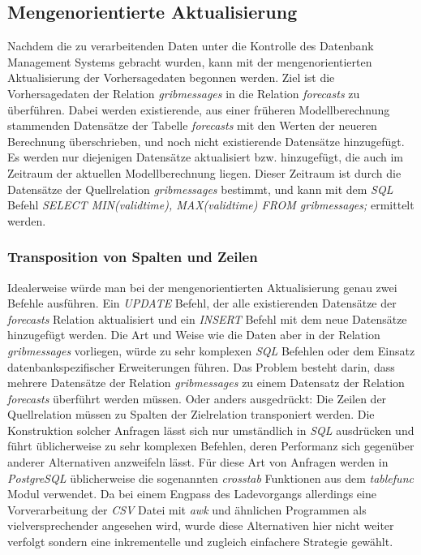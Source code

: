 \subsection{Mengenorientierte Aktualisierung}
Nachdem die zu verarbeitenden Daten unter die Kontrolle des Datenbank
Management Systems gebracht wurden, kann mit der mengenorientierten
Aktualisierung der Vorhersagedaten begonnen werden. Ziel ist die
Vorhersagedaten der Relation \textit{grib\textunderscore messages} in
die Relation \textit{forecasts} zu überführen. Dabei werden
existierende, aus einer früheren Modellberechnung stammenden
Datensätze der Tabelle \textit{forecasts} mit den Werten der neueren
Berechnung überschrieben, und noch nicht existierende Datensätze
hinzugefügt. Es werden nur diejenigen Datensätze aktualisiert bzw.
hinzugefügt, die auch im Zeitraum der aktuellen Modellberechnung
liegen. Dieser Zeitraum ist durch die Datensätze der Quellrelation
\textit{grib\textunderscore messages} bestimmt, und kann mit dem
\textit{SQL} Befehl \textit{SELECT MIN(valid\textunderscore time),
  MAX(valid\textunderscore time) FROM grib\textunderscore messages;}
ermittelt werden. 

\subsubsection{Transposition von Spalten und Zeilen}
Idealerweise würde man bei der mengenorientierten Aktualisierung genau
zwei Befehle ausführen. Ein \textit{UPDATE} Befehl, der alle
existierenden Datensätze der \textit{forecasts} Relation aktualisiert
und ein \textit{INSERT} Befehl mit dem neue Datensätze hinzugefügt
werden. Die Art und Weise wie die Daten aber in der Relation
\textit{grib\textunderscore messages} vorliegen, würde zu sehr
komplexen \textit{SQL} Befehlen oder dem Einsatz datenbankspezifischer
Erweiterungen führen. Das Problem besteht darin, dass mehrere
Datensätze der Relation \textit{grib\textunderscore messages} zu einem
Datensatz der Relation \textit{forecasts} überführt werden
müssen. Oder anders ausgedrückt: Die Zeilen der Quellrelation müssen
zu Spalten der Zielrelation transponiert werden. Die Konstruktion
solcher Anfragen lässt sich nur umständlich in \textit{SQL} ausdrücken
und führt üblicherweise zu sehr komplexen Befehlen, deren Performanz
sich gegenüber anderer Alternativen anzweifeln lässt. Für diese Art
von Anfragen werden in \textit{PostgreSQL} üblicherweise die
sogenannten \textit{crosstab} Funktionen aus dem \textit{tablefunc}
Modul verwendet. Da bei einem Engpass des Ladevorgangs allerdings eine
Vorverarbeitung der \textit{CSV} Datei mit \textit{awk} und ähnlichen
Programmen als vielversprechender angesehen wird, wurde diese
Alternativen hier nicht weiter verfolgt sondern eine inkrementelle und
zugleich einfachere Strategie gewählt. 

